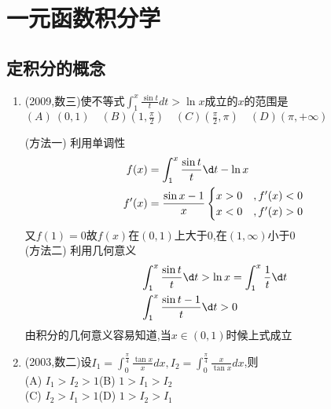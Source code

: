 \documentclass[12pt, a4paper, oneside, UTF8]{ctexbook}
\begin{document}
\else
\fi

\chapter{一元函数积分学}
\section{ 定积分的概念}

\begin{enumerate}[label=\arabic*.,start=2]
    \item (2009,数三)使不等式$\int_1^x\frac{\sin t}{t} dt>\ln x$成立的$x$的范围是 \\
        $(A)\ (0,1)\quad(B)\left(1,\frac{\pi}{2}\right)\quad
        (C)\left(\frac{\pi}{2},\pi\right)\quad(D)(\pi,+\infty)$
    
    \begin{solution}
    (方法一) 利用单调性
    \begin{align*}
        f(x)  &= \int_{1}^{x}\frac{\sin{t}}{t}\d t -\ln{x} \\
        f'(x) &= \frac{\sin{x} - 1}{x}\begin{cases}
            x > 0 &, f'(x) < 0 \\
            x < 0 &, f'(x) > 0
        \end{cases}
    \end{align*}
    又$f(1)=0$故$f(x)$在$(0,1)$上大于0,在$(1,\infty)$小于0 \\
    (方法二) 利用几何意义 
    \begin{align*}
        &\int_{1}^{x}\frac{\sin t}{t}\d t > \ln{x} = \int_{1}^{x}\frac{1}{t}\d t \\
        &\int_{1}^{x}\frac{\sin{t} - 1}{t}\d t > 0
    \end{align*}
    由积分的几何意义容易知道,当$x\in(0,1)$时候上式成立
    \end{solution}
    
    \item (2003,数二)设$I_1=\int_0^{\frac{\pi}{4}}\frac{\tan x}{x} dx, 
    I_2=\int_0^{\frac{\pi}{4}}\frac{x}{\tan x} dx$,则 \\
    (A) $I_1>I_2>1$\quad(B) $1>I_1>I_2$ \\
    (C) $I_2>I_1>1$\quad(D) $1>I_2>I_1$
    

\end{enumerate}
\end{document}
